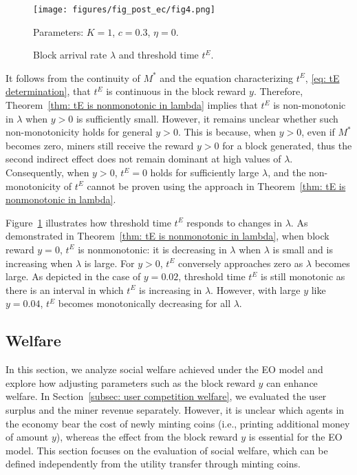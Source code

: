 \documentclass[12pt, letterpaper]{article}
\begin{document}
\begin{figure}[tbp]
    \centering
    \texttt{[image: figures/fig\_post\_ec/fig4.png]}
    \caption{Block arrival rate $\lambda$ and threshold time $t^E$.}
    \label{fig: effect of lambda on tE}
    \begin{center}\footnotesize
        Parameters: $K = 1$, $c = 0.3$, $\eta = 0$. 
    \end{center}
\end{figure}

It follows from the continuity of $M^*$ and the equation characterizing $t^E$, \eqref{eq: tE determination}, that $t^E$ is continuous in the block reward $y$. Therefore, Theorem~\ref{thm: tE is nonmonotonic in lambda} implies that $t^E$ is non-monotonic in $\lambda$ when $y > 0$ is sufficiently small. However, it remains unclear whether such non-monotonicity holds for general $y > 0$. This is because, when $y > 0$, even if $M^*$ becomes zero, miners still receive the reward $y > 0$ for a block generated, thus the second indirect effect does not remain dominant at high values of $\lambda$. Consequently, when $y > 0$, $t^E = 0$ holds for sufficiently large $\lambda$, and the non-monotonicity of $t^E$ cannot be proven using the approach in Theorem~\ref{thm: tE is nonmonotonic in lambda}.

Figure~\ref{fig: effect of lambda on tE} illustrates how threshold time $t^E$ responds to changes in $\lambda$. As demonstrated in Theorem~\ref{thm: tE is nonmonotonic in lambda}, when block reward $y = 0$, $t^E$ is nonmonotonic: it is decreasing in $\lambda$ when $\lambda$ is small and is increasing when $\lambda$ is large. For $y > 0$, $t^E$ conversely approaches zero as $\lambda$ becomes large. As depicted in the case of $y = 0.02$, threshold time $t^E$ is still monotonic as there is an interval in which $t^E$ is increasing in $\lambda$. However, with large $y$ like $y = 0.04$, $t^E$ becomes monotonically decreasing for all $\lambda$.



\subsection{Welfare}

In this section, we analyze social welfare achieved under the EO model and explore how adjusting parameters such as the block reward $y$ can enhance welfare. In Section~\ref{subsec: user competition welfare}, we evaluated the user surplus and the miner revenue separately. However, it is unclear which agents in the economy bear the cost of newly minting coins (i.e., printing additional money of amount $y$), whereas the effect from the block reward $y$ is essential for the EO model. This section focuses on the evaluation of social welfare, which can be defined independently from the utility transfer through minting coins.
\end{document}
